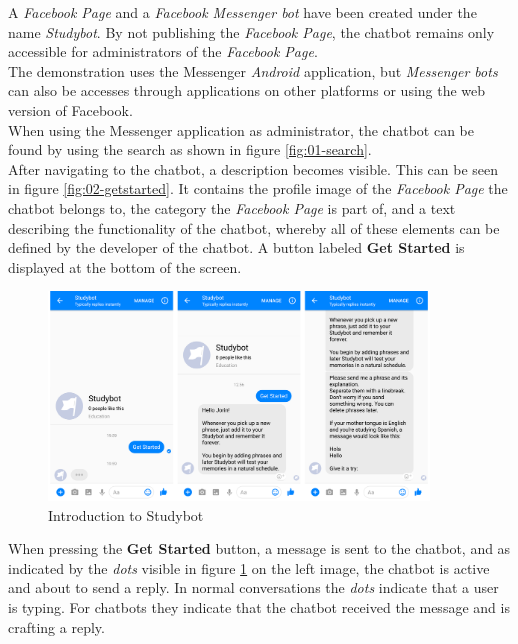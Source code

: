 A \emph{Facebook Page} and a \emph{Facebook Messenger bot} have been created under the name \emph{Studybot}.
By not publishing the \emph{Facebook Page}, the chatbot remains only accessible for administrators of the \emph{Facebook Page}.
\\
The demonstration uses the Messenger \emph{Android} application,
but \emph{Messenger bots} can also be accesses through applications on other platforms
or using the web version of Facebook.
\\

When using the Messenger application as administrator,
the chatbot can be found by using the search as shown in figure \ref{fig:01-search}.
\\

After navigating to the chatbot,
a description becomes visible.
This can be seen in figure \ref{fig:02-getstarted}.
It contains the profile image of the \emph{Facebook Page} the chatbot belongs to,
the category the \emph{Facebook Page} is part of,
and a text describing the functionality of the chatbot,
whereby all of these elements can be defined by the developer of the chatbot.
A button labeled \textbf{Get Started} is displayed at the bottom of the screen.
\\

\begin{figure}[h]
  \centering
  \includegraphics[width=0.9\textwidth]{images/interface/03-welcome.png}
	\caption{Introduction to Studybot}
	\label{fig:03-welcome}
\end{figure}

When pressing the \textbf{Get Started} button, a message is sent to the chatbot,
and as indicated by the \emph{dots} visible in figure \ref{fig:03-welcome} on the left image,
the chatbot is active and about to send a reply.
In normal conversations the \emph{dots} indicate that a user is typing.
For chatbots they indicate that the chatbot received the message and is crafting a reply.
\\

